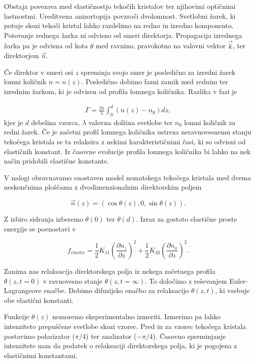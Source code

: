 \documentclass[slovene,11pt,a4paper]{article}
\begin{document}
Obstaja povezava med elastičnostjo tekočih kristalov ter njihovimi optičnimi lastnostmi. Ureditvena anizortopija povzroči dvolomnost. Svetlobni žarek, ki potuje skozi tekoči kristal lahko razdelimo na redno in izredno komponento. Potovanje rednega žarka ni odvisno od smeri direktorja. Propagacija izrednega žarka pa je odvisna od kota $\theta$ med ravnino, pravokotno na valovni vektor $\vec{k}$, ter direktorjem $\vec{n}$.

Če direktor v smeri osi $z$ spreminja svojo smer je posledično za izredni žarek lomni količnik $n = n(z)$. Posledično dobimo fazni zamik med rednim ter izrednim žarkom, ki je odvisen od profila lomnega količnika. Razlika v fazi je

\begin{eqnarray}
    \Gamma = \frac{2\pi}{\lambda} \int_{0}^{d} (n(z) - n_0)dz,
\end{eqnarray}
kjer je $d$ debelina vzorca, $\lambda$ valovna dolžina svetlobe ter $n_0$ lomni količnik za redni žarek. Če je začetni profil lomnega količnika ustreza neravnovesnemu stanju tekočega kristala se ta relaksira z nekimi karakterističnimi časi, ki so odvisni od elastičnih konstant. Iz časovne evolucije profila lomnega količnika bi lahko na nek način pridobili elastične konstante.

V nalogi obravnavamo enostaven model nematskega tekočega kristala med dvema neskončnima ploščama z dvodimenzionalnim direktorskim poljem

\begin{equation}
    \vec{n}(z) = (\cos \theta (z), 0, \sin \theta (z)).
\end{equation}

Z izbiro sidranja izberemo $\theta (0)$ ter $\theta (d)$. Izraz za gostoto elastične proste energije se poenostavi v

\begin{equation}
    f_{elastic} = 
    \frac{1}{2} K_{11} \left( \frac{\partial n_z}{\partial z} \right)^2 + 
    \frac{1}{2} K_{33} \left( \frac{\partial n_x}{\partial z} \right)^2.
\end{equation}

Zanima nas relaksacija direktorskega polja iz nekega začetnega profila $\theta (z, t=0)$ v ravnovesno stanje $\theta(z, t=\infty)$. To določimo z reševanjem Euler-Lagrangeove enačbe. Dobimo difuzijsko enačbo za relaksacijo $\theta (z, t)$, ki vsebuje obe elastični konstanti.

Funkcije $\theta (z)$ nemoremo eksperimentalno izmeriti. Izmerimo pa lahko intenziteto prepuščene svetlobe skozi vzorec. Pred in za vzorec tekočega kristala postavimo polarizator ($\pi / 4$) ter analizator ($-\pi / 4$). Časovno spreminjanje intenzitete nam da podatek o relaksaciji direktorskega polja, ki je pogojena z elastičnimi konstantami.
\end{document}
